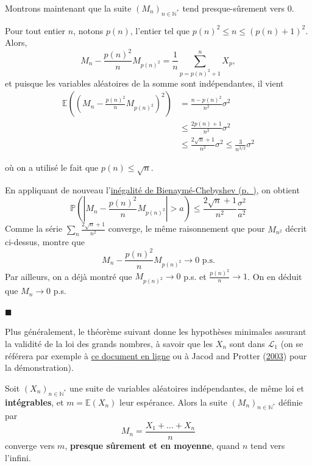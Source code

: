 \begin{preuve}
Montrons maintenant que la suite \((M_n)_{n\in\mathbb{N}^\ast}\) tend
presque-sûrement vers 0.

Pour tout entier \(n\), notons \(p(n)\), l'entier tel que
\(p(n)^2 \leq n \leq (p(n)+1)^2\). Alors,
\[ M_n - \frac{p(n)^2}{n}M_{p(n)^2} = \frac{1}{n} \sum_{p = p(n)^2+1}^{n} X_p,\]
et puisque les variables aléatoires de la somme sont indépendantes, il
vient \begin{align*}
\mathbb{E}\left(\left(M_n - \frac{p(n)^2}{n}M_{p(n)^2}\right)^2\right) & = \frac{n-p(n)^2}{n^2}\sigma^2 \\
                                                                 & \leq \frac{2p(n)+1}{n^2} \sigma^2 \\
                                                                 & \leq \frac{2\sqrt{n}+1}{n^2} \sigma^2 \leq \frac{3}{n^{3/2}}\sigma^2
\end{align*}

où on a utilisé le fait que \(p(n) \leq \sqrt{n}\).

En appliquant de nouveau l'\protect\hyperref[IV-inegbc]{inégalité de
Bienaymé-Chebyshev (p.~\pageref*{IV-inegbc})}, on obtient
\[ \mathbb{P}\left(\left|M_n - \frac{p(n)^2}{n}M_{p(n)^2}\right|>a\right) \leq \frac{2\sqrt{n}+1}{n^2} \frac{\sigma^2}{a^2}\]
Comme la série \(\sum_n \frac{2\sqrt{n}+1}{n^2}\) converge, le même
raisonnement que pour \(M_{n^2}\) décrit ci-dessus, montre que
\[ M_n - \frac{p(n)^2}{n}M_{p(n)^2} \to 0 \text{ p.s.}\] Par ailleurs,
on a déjà montré que \(M_{p(n)^2} \to 0\) p.s. et
\(\frac{p(n)^2}{n} \to 1\). On en déduit que \(M_n \to 0\) p.s. 

\hfill$\blacksquare$

\end{preuve}

Plus généralement, le théorème suivant donne les hypothèses minimales
assurant la validité de la loi des grands nombres, à savoir que les
\(X_n\) sont dans \(\mathcal{L}_1\) (on se référera par exemple à
\href{https://perso.univ-rennes1.fr/ismael.bailleul/AGREG/COURS/LFGN.pdf}{ce
document en ligne} ou à Jacod and Protter
(\protect\hyperlink{refIV-Jacod}{2003}) pour la démonstration).

\begin{theoreme}\label{IV-lfgn}

Soit \((X_n)_{n\in\mathbb{N}^\ast}\) une suite de variables aléatoires
indépendantes, de même loi et \textbf{intégrables}, et
\(m = \mathbb{E}(X_n)\) leur espérance. Alors la suite
\((M_n)_{n\in\mathbb{N}^\ast}\) définie par
\[M_n = \frac{X_1 + \ldots + X_n}{n}\] converge vers \(m\),
\textbf{presque sûrement et en moyenne}, quand \(n\) tend vers l'infini.
\end{theoreme}

